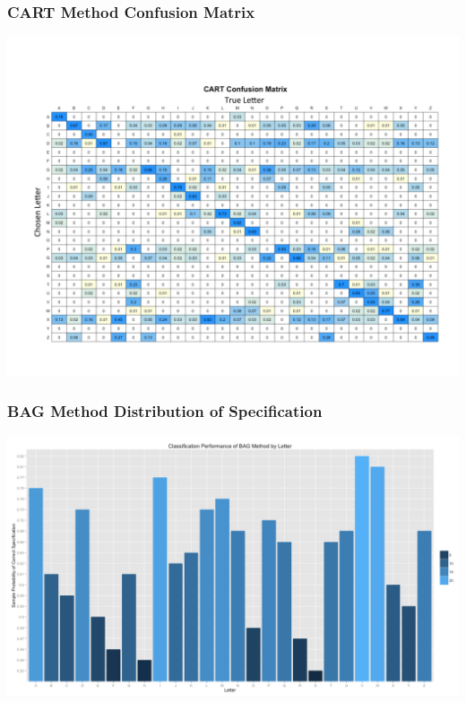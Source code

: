 \documentclass{beamer}
\begin{document}
\begin{frame}
\frametitle{CART Method Confusion Matrix}
\begin{center} 
\includegraphics[width=.9 \textwidth]{cartConfuse}
\end{center}
\end{frame}

\begin{frame}
\frametitle{BAG Method Distribution of Specification}
\begin{center} 
\includegraphics[width=1 \textwidth]{bagPlot}
\end{center}
\end{frame}
\end{document}
